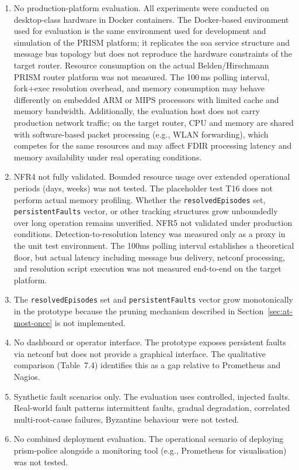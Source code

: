\begin{enumerate}
\item No production-platform evaluation. All experiments were conducted on desktop-class hardware in Docker containers. The Docker-based environment used for evaluation is the same environment used for development and simulation of the PRISM platform; it replicates the \gls{soa} service structure and message bus topology but does not reproduce the hardware constraints of the target router. Resource consumption on the actual Belden/Hirschmann PRISM router platform was not measured. The 100\,ms polling interval, fork+exec resolution overhead, and memory consumption may behave differently on embedded ARM or MIPS processors with limited cache and memory bandwidth. Additionally, the evaluation host does not carry production network traffic; on the target router, CPU and memory are shared with software-based packet processing (e.g., WLAN forwarding), which competes for the same resources and may affect FDIR processing latency and memory availability under real operating conditions.

\item NFR4 not fully validated. Bounded resource usage over extended operational periods (days, weeks) was not tested. The placeholder test T16 does not perform actual memory profiling. Whether the \texttt{resolvedEpisodes} set, \texttt{persistentFaults} vector, or other tracking structures grow unboundedly over long operation remains unverified. NFR5 not validated under production conditions. Detection-to-resolution latency was measured only as a proxy in the unit test environment. The 100ms polling interval establishes a theoretical floor, but actual latency including message bus delivery, \gls{netconf} processing, and resolution script execution was not measured end-to-end on the target platform.

\item The \texttt{resolvedEpisodes} set and \texttt{persistentFaults} vector grow monotonically in the prototype because the pruning mechanism described in Section~\ref{sec:at-most-once} is not implemented.

\item No dashboard or operator interface. The prototype exposes persistent faults via \gls{netconf} but does not provide a graphical interface. The qualitative comparison (Table~7.4) identifies this as a gap relative to Prometheus and Nagios.

\item Synthetic fault scenarios only. The evaluation uses controlled, injected faults. Real-world fault patterns intermittent faults, gradual degradation, correlated multi-root-cause failures, Byzantine behaviour were not tested.

\item No combined deployment evaluation. The operational scenario of deploying prism-police alongside a monitoring tool (e.g., Prometheus for visualisation) was not tested.
\end{enumerate}

